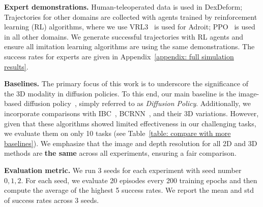 
\textbf{Expert demonstrations.} Human-teleoperated data is used in DexDeform;  Trajectories for other domains are collected with agents trained by reinforcement learning (RL) algorithms, where we use VRL3~\citep{wang2022vrl3} is used for Adroit; PPO~\citep{schulman2017ppo} is used in all other domains. We generate successful trajectories with RL agents and ensure all imitation learning algorithms are using the same demonstrations. The success rates for experts are given in Appendix~\ref{appendix: full simulation results}.


\textbf{Baselines.} The primary focus of this work is to underscore the significance of the 3D modality in diffusion policies. To this end, our main baseline is the image-based diffusion policy~\citep{chi2023diffusion_policy}, simply referred to as \textit{Diffusion Policy}. Additionally, we incorporate comparisons with IBC~\citep{florence2022ibc},  BCRNN~\citep{mandlekar2021robomimic}, and their 3D variations. However, given that these algorithms showed limited effectiveness in our challenging tasks, we evaluate them on only 10 tasks (see Table~\ref{table: compare with more baselines}). We emphasize that the image and depth resolution for all 2D and 3D methods are \textbf{the same} across all experiments, ensuring a fair comparison.








\textbf{Evaluation metric.} We run 3 seeds for each experiment with seed number $0,1,2$. For each seed, we evaluate 20 episodes every 200 training epochs and then compute the average of the highest 5 success rates. We report the mean and std of success rates across 3 seeds.








